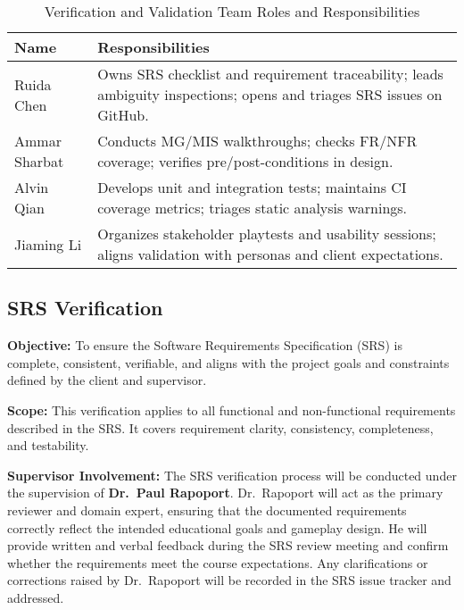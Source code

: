 \documentclass[12pt, titlepage]{article}
\begin{document}
\begin{table}[H]
\centering
\caption{Verification and Validation Team Roles and Responsibilities}
\label{tab:vvteam}
\begin{tabularx}{\textwidth}{lX}
\toprule
\textbf{Name} & \textbf{Responsibilities} \\
\midrule
Ruida Chen & Owns SRS checklist and requirement traceability; leads ambiguity inspections; opens and triages SRS issues on GitHub. \\
Ammar Sharbat & Conducts MG/MIS walkthroughs; checks FR/NFR coverage; verifies pre/post-conditions in design. \\
Alvin Qian & Develops unit and integration tests; maintains CI coverage metrics; triages static analysis warnings. \\
Jiaming Li & Organizes stakeholder playtests and usability sessions; aligns validation with personas and client expectations. \\
\bottomrule
\end{tabularx}
\end{table}

\subsection{SRS Verification}
\textbf{Objective:}  
To ensure the Software Requirements Specification (SRS) is complete, consistent, verifiable, and aligns with the project goals and constraints defined by the client and supervisor.

\noindent \textbf{Scope:}  
This verification applies to all functional and non-functional requirements described in the SRS. It covers requirement clarity, consistency, completeness, and testability.  

\noindent \textbf{Supervisor Involvement:}  
The SRS verification process will be conducted under the supervision of \textbf{Dr.\ Paul Rapoport}.  
Dr.\ Rapoport will act as the primary reviewer and domain expert, ensuring that the documented requirements correctly reflect the intended educational goals and gameplay design.  
He will provide written and verbal feedback during the SRS review meeting and confirm whether the requirements meet the course expectations.  
Any clarifications or corrections raised by Dr.\ Rapoport will be recorded in the SRS issue tracker and addressed.
\end{document}
